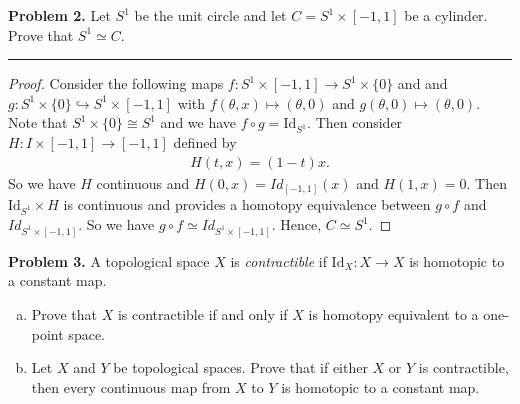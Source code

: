 \documentclass[leqno]{article}
\theoremstyle{nonumberplain}
\newtheorem{proof}{Proof}
\begin{document}
\pagebreak



\noindent\textbf{Problem 2.} Let $S^1$ be the unit circle and let $C=S^1\times [-1,1]$ be a cylinder. Prove that $S^1 \simeq C$.  


\noindent\rule[0.5ex]{\linewidth}{1pt}

\begin{proof}
Consider the following maps $f\colon S^1 \times [-1,1] \to S^1 \times \{0\}$ and and $g\colon S^1 \times \{0\} \hookrightarrow S^1\times [-1,1]$ with $f(\theta,x)\mapsto (\theta,0)$ and $g(\theta,0)\mapsto (\theta,0)$.  Note that $S^1\times \{0\} \cong S^1$ and we have $f\circ g = \mathrm{Id}_{S^1}$.  Then consider $H \colon I \times [-1,1] \to [-1,1]$ defined by 
\begin{align*}
H(t,x)= (1-t)x.
\end{align*}
So we have $H$ continuous and $H(0,x)=Id_{[-1,1]}(x)$ and $H(1,x)=0$. Then $\mathrm{Id}_{S^1} \times H$ is continuous and provides a homotopy equivalence between $g\circ f$ and $Id_{S^1 \times [-1,1]}$. So we have $g\circ f \simeq Id_{S^1 \times [-1,1]}$.  Hence, $C\simeq S^1$.
\end{proof}


\pagebreak




\noindent\textbf{Problem 3.} A topological space $X$ is \emph{contractible} if $\mathrm{Id}_X \colon X \to X$ is homotopic to a constant map.
\begin{enumerate}[(a)]
\item Prove that $X$ is contractible if and only if $X$ is homotopy equivalent to a one-point space.
\item Let $X$ and $Y$ be topological spaces. Prove that if either $X$ or $Y$ is contractible, then every continuous map from $X$ to $Y$ is homotopic to a constant map.
\end{enumerate}
\end{document}
